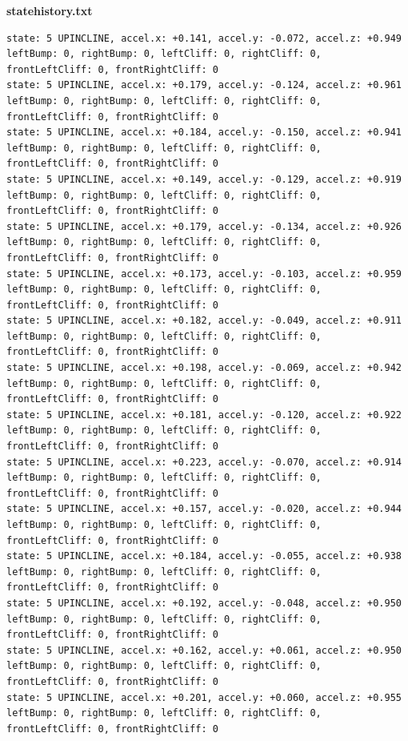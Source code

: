 \documentclass[twoside]{article}
\begin{document}
\newpage
\textbf{statehistory.txt}
\vspace{-3mm}
\begin{lstlisting}[mathescape, frame=single]
state: 5 UPINCLINE, accel.x: +0.141, accel.y: -0.072, accel.z: +0.949      leftBump: 0, rightBump: 0, leftCliff: 0, rightCliff: 0, frontLeftCliff: 0, frontRightCliff: 0 
state: 5 UPINCLINE, accel.x: +0.179, accel.y: -0.124, accel.z: +0.961      leftBump: 0, rightBump: 0, leftCliff: 0, rightCliff: 0, frontLeftCliff: 0, frontRightCliff: 0 
state: 5 UPINCLINE, accel.x: +0.184, accel.y: -0.150, accel.z: +0.941      leftBump: 0, rightBump: 0, leftCliff: 0, rightCliff: 0, frontLeftCliff: 0, frontRightCliff: 0 
state: 5 UPINCLINE, accel.x: +0.149, accel.y: -0.129, accel.z: +0.919      leftBump: 0, rightBump: 0, leftCliff: 0, rightCliff: 0, frontLeftCliff: 0, frontRightCliff: 0 
state: 5 UPINCLINE, accel.x: +0.179, accel.y: -0.134, accel.z: +0.926      leftBump: 0, rightBump: 0, leftCliff: 0, rightCliff: 0, frontLeftCliff: 0, frontRightCliff: 0 
state: 5 UPINCLINE, accel.x: +0.173, accel.y: -0.103, accel.z: +0.959      leftBump: 0, rightBump: 0, leftCliff: 0, rightCliff: 0, frontLeftCliff: 0, frontRightCliff: 0 
state: 5 UPINCLINE, accel.x: +0.182, accel.y: -0.049, accel.z: +0.911      leftBump: 0, rightBump: 0, leftCliff: 0, rightCliff: 0, frontLeftCliff: 0, frontRightCliff: 0 
state: 5 UPINCLINE, accel.x: +0.198, accel.y: -0.069, accel.z: +0.942      leftBump: 0, rightBump: 0, leftCliff: 0, rightCliff: 0, frontLeftCliff: 0, frontRightCliff: 0 
state: 5 UPINCLINE, accel.x: +0.181, accel.y: -0.120, accel.z: +0.922      leftBump: 0, rightBump: 0, leftCliff: 0, rightCliff: 0, frontLeftCliff: 0, frontRightCliff: 0 
state: 5 UPINCLINE, accel.x: +0.223, accel.y: -0.070, accel.z: +0.914      leftBump: 0, rightBump: 0, leftCliff: 0, rightCliff: 0, frontLeftCliff: 0, frontRightCliff: 0 
state: 5 UPINCLINE, accel.x: +0.157, accel.y: -0.020, accel.z: +0.944      leftBump: 0, rightBump: 0, leftCliff: 0, rightCliff: 0, frontLeftCliff: 0, frontRightCliff: 0 
state: 5 UPINCLINE, accel.x: +0.184, accel.y: -0.055, accel.z: +0.938      leftBump: 0, rightBump: 0, leftCliff: 0, rightCliff: 0, frontLeftCliff: 0, frontRightCliff: 0 
state: 5 UPINCLINE, accel.x: +0.192, accel.y: -0.048, accel.z: +0.950      leftBump: 0, rightBump: 0, leftCliff: 0, rightCliff: 0, frontLeftCliff: 0, frontRightCliff: 0 
state: 5 UPINCLINE, accel.x: +0.162, accel.y: +0.061, accel.z: +0.950      leftBump: 0, rightBump: 0, leftCliff: 0, rightCliff: 0, frontLeftCliff: 0, frontRightCliff: 0 
state: 5 UPINCLINE, accel.x: +0.201, accel.y: +0.060, accel.z: +0.955      leftBump: 0, rightBump: 0, leftCliff: 0, rightCliff: 0, frontLeftCliff: 0, frontRightCliff: 0 

\end{lstlisting}
\end{document}
